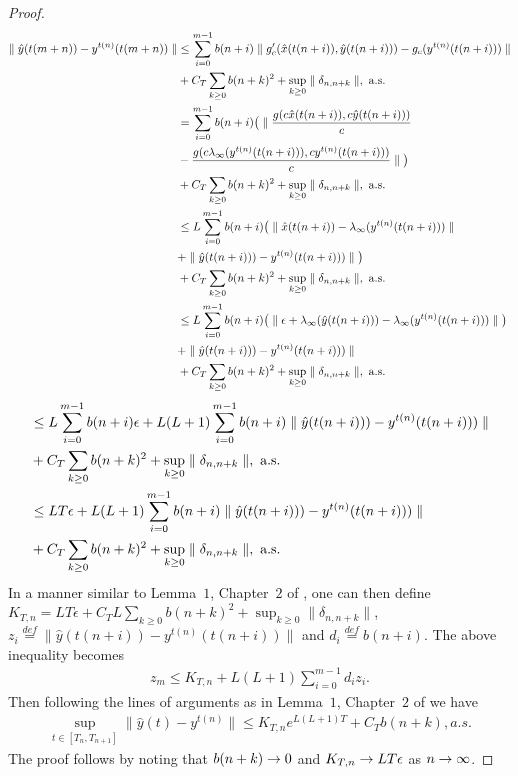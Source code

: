 \begin{proof}
\begin{align}
\parallel \hat{y}(t(m+n))-y^{t(n)}(t(m+n))\parallel & \leq\sum_{i=0}^{m-1}b(n+i)\parallel
g'_c(\hat{x}(t(n+i)),\hat{y}(t(n+i)))-g_c(y^{t(n)}(t(n+i)))\parallel \nonumber\\&
+C_T\sum_{k\geq 0}b(n+k)^2+\sup_{k\geq 0} \parallel \delta_{n,n+k}\parallel, \text{ a.s.}\nonumber\\
&=\sum_{i=0}^{m-1}b(n+i)\big(\parallel\frac{g(c\hat{x}(t(n+i)),c\hat{y}(t(n+i)))}{c}\nonumber\\&-\frac{g(c\lambda_\infty(y^{t(n)}(t(n+i))),cy^{t(n)}(t(n+i)))}{c}\parallel\big)\nonumber\\&+C_T\sum_{k\geq 0}b(n+k)^2+\sup_{k\geq 0}
\parallel \delta_{n,n+k}\parallel, \text{ a.s.}\nonumber\\
&\leq L\sum_{i=0}^{m-1}b(n+i)\big(\parallel \hat{x}(t(n+i)) -\lambda_\infty(y^{t(n)}(t(n+i)))\parallel
\nonumber\\&+\parallel \hat{y}(t(n+i)))-y^{t(n)}(t(n+i)))\parallel \big)\nonumber\\&+C_T\sum_{k\geq 0}b(n+k)^2+
\sup_{k\geq 0} \parallel \delta_{n,n+k}\parallel, \text{ a.s.}\nonumber\\
&\leq L\sum_{i=0}^{m-1}b(n+i) \big(\parallel \epsilon+\lambda_\infty(\hat{y}(t(n+i))) -
\lambda_\infty(y^{t(n)}(t(n+i)))\parallel \big)\nonumber\\&+\parallel \hat{y}(t(n+i)))-y^{t(n)}(t(n+i)))\parallel
\nonumber\\&+C_T\sum_{k\geq 0}b(n+k)^2+\sup_{k\geq 0} \parallel \delta_{n,n+k}\parallel, \text{ a.s.}\nonumber
\end{align}
\begin{align}
&\leq L\sum_{i=0}^{m-1}b(n+i)\epsilon+ L(L+1) \sum_{i=0}^{m-1}b(n+i) \parallel
\hat{y}(t(n+i)))-y^{t(n)}(t(n+i)))\parallel \nonumber\\&+C_T\sum_{k\geq 0}b(n+k)^2+\sup_{k\geq 0} 
\parallel \delta_{n,n+k}\parallel, \text{ a.s.}\nonumber\\
&\leq LT\epsilon+ L(L+1) \sum_{i=0}^{m-1}b(n+i) \parallel \hat{y}(t(n+i)))-y^{t(n)}(t(n+i)))\parallel
\nonumber\\&+C_T\sum_{k\geq 0}b(n+k)^2+\sup_{k\geq 0} \parallel \delta_{n,n+k}\parallel, \text{ a.s.}\nonumber
\end{align}
In a manner similar to Lemma~$1$, Chapter~$2$ of \cite{SA}, one can then define $K_{T,n}=LT\epsilon+C_TL\sum_{k\geq 0}b(n+k)^2+\sup_{k\geq 0}\parallel \delta_{n,n+k}\parallel$, $z_i\stackrel{def}{=}\parallel
\hat{y}(t(n+i))-y^{t(n)}(t(n+i))\parallel$ and $d_i\stackrel{def}{=}b(n+i)$. The above inequality becomes
\begin{align}
z_m\leq K_{T,n}+L(L+1)\sum_{i=0}^{m-1}d_iz_i.
\end{align}
Then following the lines of arguments as in Lemma~$1$, Chapter~$2$ of \cite{SA} we have
\begin{align}
\underset{t\in[T_n,T_{n+1}]}{\sup}\parallel \hat{y}(t)-y^{t(n)}\parallel 
\leq K_{T,n}e^{L(L+1)T}+C_T b(n+k), a.s.
\end{align}
The proof follows by noting that $b(n+k)\rightarrow 0$ and $K_{T,n}\rightarrow LT\epsilon$ as $n \rightarrow \infty$.
\end{proof}

